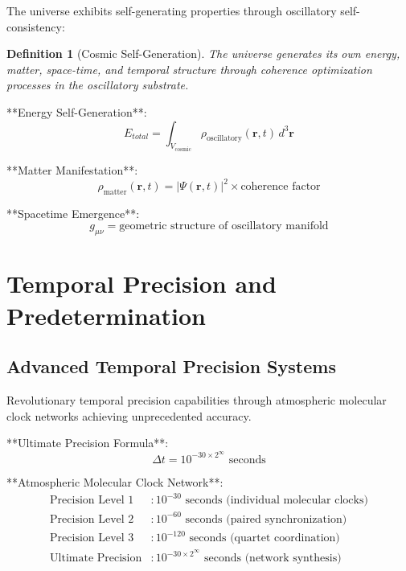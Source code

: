 \documentclass[12pt,a4paper]{article}
\newtheorem{definition}[theorem]{Definition}
\theoremstyle{remark}
\begin{document}
The universe exhibits self-generating properties through oscillatory self-consistency:

\begin{definition}[Cosmic Self-Generation]
The universe generates its own energy, matter, space-time, and temporal structure through coherence optimization processes in the oscillatory substrate.
\end{definition}

**Energy Self-Generation**:
\begin{equation}
E_{total} = \int_{V_{\text{cosmic}}} \rho_{\text{oscillatory}}(\mathbf{r}, t) \, d^3\mathbf{r}
\end{equation}

**Matter Manifestation**:
\begin{equation}
\rho_{\text{matter}}(\mathbf{r}, t) = |\Psi(\mathbf{r}, t)|^2 \times \text{coherence factor}
\end{equation}

**Spacetime Emergence**:
\begin{equation}
g_{\mu\nu} = \text{geometric structure of oscillatory manifold}
\end{equation}

\section{Temporal Precision and Predetermination}

\subsection{Advanced Temporal Precision Systems}

Revolutionary temporal precision capabilities through atmospheric molecular clock networks achieving unprecedented accuracy.

**Ultimate Precision Formula**:
\begin{equation}
\Delta t = 10^{-30 \times 2^{\infty}} \text{ seconds}
\end{equation}

**Atmospheric Molecular Clock Network**:
\begin{align}
\text{Precision Level 1} &: 10^{-30} \text{ seconds (individual molecular clocks)} \\
\text{Precision Level 2} &: 10^{-60} \text{ seconds (paired synchronization)} \\
\text{Precision Level 3} &: 10^{-120} \text{ seconds (quartet coordination)} \\
\text{Ultimate Precision} &: 10^{-30 \times 2^{\infty}} \text{ seconds (network synthesis)}
\end{align}
\end{document}
